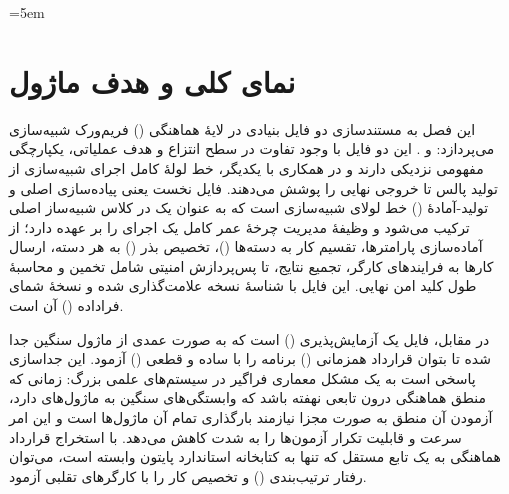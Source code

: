 \sloppy
\emergencystretch=5em

\section{نمای کلی و هدف ماژول}

این فصل به مستندسازی دو فایل بنیادی در لایۀ هماهنگی () فریم‌ورک شبیه‌سازی  می‌پردازد:  و . این دو فایل با وجود تفاوت در سطح انتزاع و هدف عملیاتی، یکپارچگی مفهومی نزدیکی دارند و در همکاری با یکدیگر، خط لولۀ کامل اجرای شبیه‌سازی از تولید پالس تا خروجی نهایی  را پوشش می‌دهند. فایل نخست یعنی  پیاده‌سازی اصلی و تولید-آمادۀ () خط لولای شبیه‌سازی است که به عنوان یک  در کلاس شبیه‌ساز اصلی ترکیب می‌شود و وظیفۀ مدیریت چرخۀ عمر کامل یک اجرای  را بر عهده دارد؛ از آماده‌سازی پارامترها، تقسیم کار به دسته‌ها ()، تخصیص بذر () به هر دسته، ارسال کارها به فرایندهای کارگر، تجمیع نتایج، تا پس‌پردازش امنیتی شامل تخمین  و محاسبۀ طول کلید امن نهایی. این فایل با شناسۀ نسخه  علامت‌گذاری شده و نسخۀ شمای فراداده () آن  است.

در مقابل، فایل  یک  آزمایش‌پذیری () است که به صورت عمدی از ماژول سنگین  جدا شده تا بتوان قرارداد همزمانی () برنامه را با  ساده و قطعی () آزمود. این جداسازی پاسخی است به یک مشکل معماری فراگیر در سیستم‌های علمی بزرگ: زمانی که منطق هماهنگی درون تابعی نهفته باشد که وابستگی‌های سنگین به ماژول‌های  دارد، آزمودن آن منطق به صورت مجزا نیازمند بارگذاری تمام آن ماژول‌ها است و این امر سرعت و قابلیت تکرار آزمون‌ها را به شدت کاهش می‌دهد. با استخراج قرارداد هماهنگی به یک تابع مستقل که تنها به کتابخانه استاندارد پایتون وابسته است، می‌توان رفتار ترتیب‌بندی () و تخصیص کار را با کارگرهای تقلبی آزمود.

